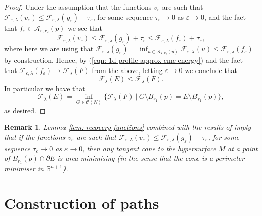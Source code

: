\documentclass[11pt]{article}
\newtheorem{rem}{Remark}
\begin{document}
\begin{proof}
\bigskip

Under the assumption that the functions $v_\varepsilon$ are such that $\mathcal{F}_{\varepsilon,\lambda}(v_\varepsilon) \leq \mathcal{F}_{\varepsilon,\lambda}(g_\varepsilon) + \tau_\varepsilon$, for some sequence $\tau_\varepsilon \rightarrow 0$ as $\varepsilon \rightarrow 0$, and the fact that $f_\varepsilon \in \mathcal{A}_{\varepsilon,r_2}(p)$ we see that
\begin{equation*}
    \mathcal{F}_{\varepsilon,\lambda}(v_\varepsilon) \leq \mathcal{F}_{\varepsilon,\lambda}(g_\varepsilon) + \tau_\varepsilon \leq \mathcal{F}_{\varepsilon,\lambda}(f_\varepsilon) + \tau_\varepsilon,
\end{equation*}
where here we are using that $\mathcal{F}_{\varepsilon,\lambda}(g_\varepsilon) = \inf_{u \in \mathcal{A}_{\varepsilon,r_2}(p)} \mathcal{F}_{\varepsilon,\lambda}(u) \leq  \mathcal{F}_{\varepsilon,\lambda}(f_\varepsilon)$ by construction. Hence, by (\ref{eqn: 1d profile approx cmc energy}) and the fact that $\mathcal{F}_{\varepsilon,\lambda}(f_\varepsilon) \rightarrow \mathcal{F}_\lambda(F)$ from the above, letting $\varepsilon \rightarrow 0$ we conclude that
\begin{equation*}
    \mathcal{F}_\lambda(E) \leq \mathcal{F}_\lambda(F).
\end{equation*}
In particular we have that
\begin{equation*}
    \mathcal{F}_\lambda(E) = \inf_{G \in \mathcal{C}(N)} \{ \mathcal{F}_\lambda(F) \: | \: G \setminus B_{r_1}(p) = E \setminus B_{r_1}(p) \},
\end{equation*}
as desired.
\end{proof}

\begin{rem}\label{rem: almost min area min cones}
Lemma \ref{lem: recovery functions} combined with the results of \cite[Section 28.2]{maggi_2012} imply that if the functions $v_\varepsilon$ are such that $\mathcal{F}_{\varepsilon,\lambda}(v_\varepsilon) \leq \mathcal{F}_{\varepsilon,\lambda}(g_\varepsilon) + \tau_\varepsilon$, for some sequence $\tau_\varepsilon \rightarrow 0$ as $\varepsilon \rightarrow 0$, then any tangent cone to the hypersurface $M$ at a point of $B_{r_1}(p) \cap \partial E$ is area-minimising (in the sense that the cone is a perimeter minimiser in $\mathbb{R}^{n+1}$).
\end{rem}


\section{Construction of paths}\label{sec: paths}
\end{document}
